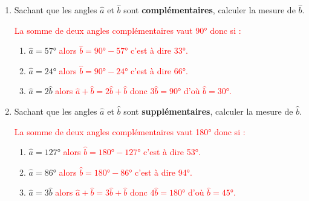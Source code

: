 \begin{corrige}
    \begin{enumerate}
        \item Sachant que les angles $\hat{a}$ et $\hat{b}$ sont \textbf{complémentaires}, calculer la mesure de $\hat{b}$.
        \par\textcolor{red}{La somme de deux angles complémentaires vaut \ang{90} donc si :}
        \par
        \begin{enumerate}
            \item $\hat{a}=\ang{57}$
            \textcolor{red}{ alors $\hat{b}=\ang{90}-\ang{57}$ c'est à dire \ang{33}.}
            \item $\hat{a}=\ang{24}$
            \textcolor{red}{ alors $\hat{b}=\ang{90}-\ang{24}$ c'est à dire \ang{66}.}
            \item $\hat{a}=2\hat{b}$
            \textcolor{red}{ alors $\hat{a}+\hat{b}=2\hat{b}+\hat{b}$ donc $3\hat{b}=\ang{90}$ d'où $\hat{b}=\ang{30}$.}
        \end{enumerate}
        \item Sachant que les angles $\hat{a}$ et $\hat{b}$ sont \textbf{supplémentaires}, calculer la mesure de $\hat{b}$.
        \par\textcolor{red}{La somme de deux angles complémentaires vaut \ang{180} donc si :}
        \par
        \begin{enumerate}
            \item $\hat{a}=\ang{127}$
            \textcolor{red}{ alors $\hat{b}=\ang{180}-\ang{127}$ c'est à dire \ang{53}.}
            \item $\hat{a}=\ang{86}$
            \textcolor{red}{ alors $\hat{b}=\ang{180}-\ang{86}$ c'est à dire \ang{94}.}
            \item $\hat{a}=3\hat{b}$
            \textcolor{red}{ alors $\hat{a}+\hat{b}=3\hat{b}+\hat{b}$ donc $4\hat{b}=\ang{180}$ d'où $\hat{b}=\ang{45}$.}
        \end{enumerate}
    \end{enumerate}
\end{corrige}